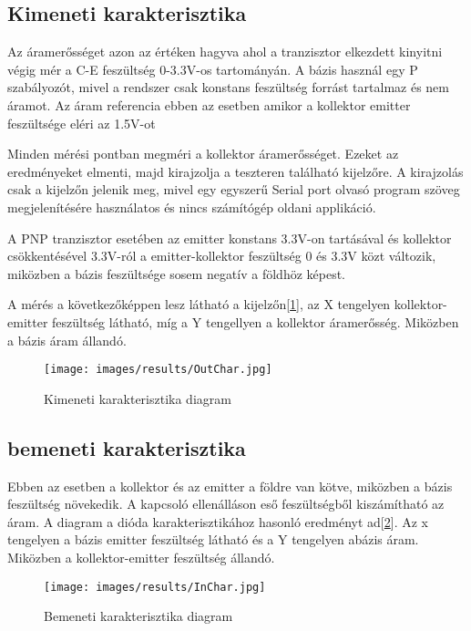 \subsection{Kimeneti karakterisztika}

Az áramerősséget azon az értéken hagyva ahol a tranzisztor elkezdett kinyitni
végig mér a C-E feszültség 0-3.3V-os tartományán. A bázis használ egy 
P szabályozót, mivel a rendszer csak konstans feszültség forrást tartalmaz
és nem áramot. Az áram referencia ebben az esetben amikor a kollektor
emitter feszültsége eléri az 1.5V-ot

Minden mérési pontban megméri a kollektor
áramerősséget. Ezeket az eredményeket elmenti, majd kirajzolja a 
teszteren található kijelzőre. A kirajzolás csak a kijelzőn
jelenik meg, mivel egy egyszerű Serial port olvasó program
szöveg megjelenítésére használatos és nincs számítógép oldani applikáció.

A PNP tranzisztor esetében az emitter konstans 3.3V-on tartásával és 
kollektor csökkentésével 3.3V-ról a emitter-kollektor feszültség
0 és 3.3V közt változik, miközben a bázis feszültsége sosem negatív
a földhöz képest.

A mérés a következőképpen lesz látható a kijelzőn[\ref{fig:OutChar}],
az X tengelyen kollektor-emitter feszültség látható, míg a Y tengellyen
a kollektor áramerősség. Miközben a bázis áram állandó.

\begin{figure}[H]
    \centering
    \texttt{[image: images/results/OutChar.jpg]}
    \caption{Kimeneti karakterisztika diagram}
    \label{fig:OutChar}
\end{figure}

\subsection{bemeneti karakterisztika}

Ebben az esetben a kollektor és az emitter a földre van kötve,
miközben a bázis feszültség növekedik. A kapcsoló ellenálláson eső feszültségből
kiszámítható az áram. A diagram a dióda karakterisztikához hasonló eredményt
ad[\ref{fig:InChar}]. Az x tengelyen a bázis emitter feszültség látható és
a Y tengelyen abázis áram. Miközben a kollektor-emitter feszültség állandó.

\begin{figure}[H]
    \centering
    \texttt{[image: images/results/InChar.jpg]}
    \caption{Bemeneti karakterisztika diagram}
    \label{fig:InChar}
\end{figure}

